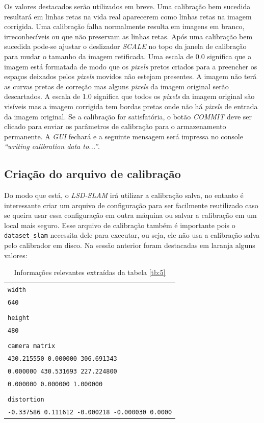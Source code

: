 

 
Os valores destacados serão utilizados em breve. Uma calibração bem sucedida resultará em linhas retas na vida real aparecerem como linhas retas na imagem corrigida. Uma calibração falha normalmente resulta em imagens em branco, irreconhecíveis ou que não preservam as linhas retas.
Após uma calibração bem sucedida pode-se ajustar o deslizador \textit{SCALE} no topo da janela de calibração para mudar o tamanho da imagem retificada. Uma escala de 0.0 significa que a imagem está formatada de modo que os \textit{pixels} pretos criados para a preencher os espaços deixados pelos \textit{pixels} movidos não estejam presentes. A imagem não terá as curvas pretas de correção mas alguns \textit{pixels} da imagem original serão descartados. A escala de 1.0 significa que todos os \textit{pixels} da imagem original são visíveis mas a imagem corrigida tem bordas pretas onde não há \textit{pixels} de entrada da imagem original.
Se a calibração for satisfatória, o botão \textit{COMMIT} deve ser clicado para enviar os parâmetros de calibração para o armazenamento permanente. A \textit{GUI} fechará e a seguinte mensagem será impressa no console \textit{“writing calibration data to...”}.

\subsection{Criação do arquivo de calibração}

Do modo que está, o \textit{LSD-SLAM} irá utilizar a calibração salva, no entanto é interessante criar um arquivo de configuração para ser facilmente reutilizado caso se queira usar essa configuração em outra máquina ou salvar a calibração em um local mais seguro. Esse arquivo de calibração também é importante pois o \texttt{dataset\_slam} necessita dele para executar, ou seja, ele não usa a calibração salva pelo calibrador em disco. Na sessão anterior foram destacadas em laranja alguns valores:

\begin{table}[!ht]\label{tb:6}
\begin{tabular}{| p{\textwidth}|}
\hline\texttt{width}\\
\texttt{640}\\
\\
\texttt{height}\\
\texttt{480}\\
\\
\texttt{camera matrix}\\
\texttt{430.215550 0.000000 306.691343}\\
\texttt{0.000000 430.531693 227.224800}\\
\texttt{0.000000 0.000000 1.000000}\\
\\
\texttt{distortion}\\
\texttt{-0.337586 0.111612 -0.000218 -0.000030 0.0000}\\
\hline
\end{tabular}
\caption{Informações relevantes extraídas da tabela \ref{tb:5}}
\end{table}


